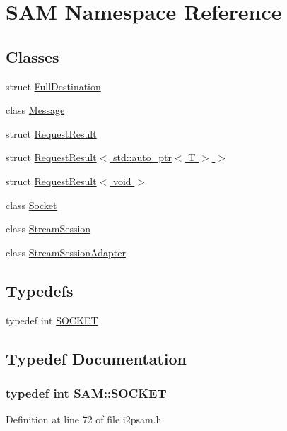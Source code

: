 \hypertarget{namespace_s_a_m}{}\section{S\+A\+M Namespace Reference}
\label{namespace_s_a_m}
\subsection*{Classes}
\begin{DoxyCompactItemize}
\item 
struct \hyperlink{struct_s_a_m_1_1_full_destination}{Full\+Destination}
\item 
class \hyperlink{class_s_a_m_1_1_message}{Message}
\item 
struct \hyperlink{struct_s_a_m_1_1_request_result}{Request\+Result}
\item 
struct \hyperlink{struct_s_a_m_1_1_request_result_3_01std_1_1auto__ptr_3_01_t_01_4_01_4}{Request\+Result$<$ std\+::auto\+\_\+ptr$<$ T $>$ $>$}
\item 
struct \hyperlink{struct_s_a_m_1_1_request_result_3_01void_01_4}{Request\+Result$<$ void $>$}
\item 
class \hyperlink{class_s_a_m_1_1_socket}{Socket}
\item 
class \hyperlink{class_s_a_m_1_1_stream_session}{Stream\+Session}
\item 
class \hyperlink{class_s_a_m_1_1_stream_session_adapter}{Stream\+Session\+Adapter}
\end{DoxyCompactItemize}
\subsection*{Typedefs}
\begin{DoxyCompactItemize}
\item 
typedef int \hyperlink{namespace_s_a_m_a346e18b1c3780d27cc960b8a432dfdf7}{S\+O\+C\+K\+E\+T}
\end{DoxyCompactItemize}


\subsection{Typedef Documentation}
\hypertarget{namespace_s_a_m_a346e18b1c3780d27cc960b8a432dfdf7}{}
\subsubsection[{S\+O\+C\+K\+E\+T}]{\setlength{\rightskip}{0pt plus 5cm}typedef int {\bf S\+A\+M\+::\+S\+O\+C\+K\+E\+T}}\label{namespace_s_a_m_a346e18b1c3780d27cc960b8a432dfdf7}


Definition at line 72 of file i2psam.\+h.

